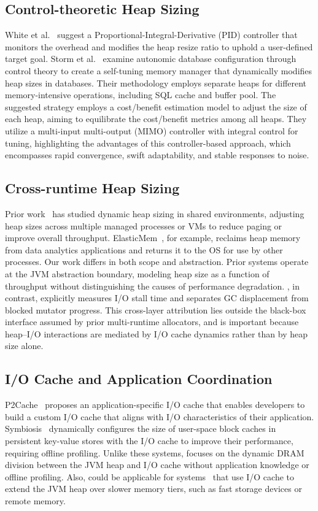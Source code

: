 \subsection{Control-theoretic Heap Sizing}
White et al.~\cite{white:pid} suggest a Proportional-Integral-Derivative (PID) controller that monitors the \flexheapGC{} overhead and modifies the heap resize ratio to uphold a user-defined target \flexheapGC{} goal.
%
Storm et al.~\cite{storm:db2} examine autonomic database configuration through control theory to create a self-tuning memory manager that dynamically modifies heap sizes in databases.
Their methodology employs separate heaps for different memory-intensive operations, including SQL cache and buffer pool.
The suggested strategy employs a cost/benefit estimation model to adjust the size of each heap, aiming to equilibrate the cost/benefit metrics among all heaps.
They utilize a multi-input multi-output (MIMO) controller with integral control for tuning, highlighting the advantages of this controller-based approach, which encompasses rapid convergence, swift adaptability, and stable responses to noise.

\subsection{Cross-runtime Heap Sizing}
Prior work~\cite{alonso:advisor,hertz:waste_not,cameron:forseti,wang:elasticMem} has studied dynamic heap sizing in shared environments, adjusting heap sizes across multiple managed processes or VMs to reduce paging or improve overall throughput.
ElasticMem~\cite{wang:elasticMem}, for example, reclaims heap memory from data analytics applications and returns it to the OS for use by other processes.
Our work differs in both scope and abstraction.
Prior systems operate at the JVM abstraction boundary, modeling heap size as a function of throughput without distinguishing the causes of performance degradation.
\flexheapName{}, in contrast, explicitly measures I/O stall time and separates GC displacement from blocked mutator progress.
This cross-layer attribution lies outside the black-box interface assumed by prior multi-runtime allocators, and is important because heap--I/O interactions are mediated by I/O cache dynamics rather than by heap size alone.

\subsection{I/O Cache and Application Coordination}
P2Cache~\cite{lee:p2cache} proposes an application-specific I/O cache that enables developers to build a custom I/O cache that aligns with I/O characteristics of their application.
%
Symbiosis~\cite{dai:symbiosis} dynamically configures the size of user-space block caches in persistent key-value stores with the I/O cache to improve their performance, requiring offline profiling.
%
Unlike these systems, \flexheapName{} focuses on the dynamic DRAM division between the JVM heap and I/O cache without application knowledge or offline profiling.
%
Also, \flexheapName{} could be applicable for systems~\cite{khanh:polar,teraheap,kolokasis:teracache,kolokasis:teraheap_toplas,kolokasis:smartsweep} that use I/O cache to extend the JVM heap over slower memory tiers, such as fast storage devices or remote memory.
